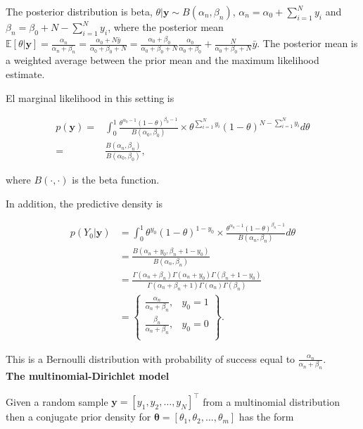 \begin{enumerate}
The posterior distribution is beta, $\theta|\mathbf{y}\sim B(\alpha_n,\beta_n)$, $\alpha_n=\alpha_0+\sum_{i=1}^N y_i$ and $\beta_n=\beta_0+N-\sum_{i=1}^Ny_i$, where the posterior mean $\mathbb{E}[\theta|\mathbf{y}]=\frac{\alpha_n}{\alpha_n+\beta_n}=\frac{\alpha_0+N\bar{y}}{\alpha_0+\beta_0+N}=\frac{\alpha_0+\beta_0}{\alpha_0+\beta_0+N}\frac{\alpha_0}{\alpha_0+\beta_0}+\frac{N}{\alpha_0+\beta_0+N}\bar{y}$. The posterior mean is a weighted average between the prior mean and the maximum likelihood estimate.

El marginal likelihood in this setting is

\begin{align}
	p(\mathbf{y})=&\int_{0}^1 \frac{\theta^{\alpha_0-1}(1-\theta)^{\beta_0-1}}{B(\alpha_0,\beta_0)}\times \theta^{\sum_{i=1}^N y_i}(1-\theta)^{N-\sum_{i=1}^N y_i}d\theta\nonumber\\
	=& \frac{B(\alpha_n,\beta_n)}{B(\alpha_0,\beta_0)},\nonumber
\end{align}

where $B(\cdot ,\cdot)$ is the beta function.

In addition, the predictive density is

\begin{align}
	p(Y_0|\mathbf{y})&=\int_0^1 \theta^{y_0}(1-\theta)^{1-y_0}\times \frac{\theta^{\alpha_n-1}(1-\theta)^{\beta_n-1}}{B(\alpha_n,\beta_n)}d\theta\nonumber\\
	&=\frac{B(\alpha_n+y_0,\beta_n+1-y_0)}{B(\alpha_n,\beta_n)}\nonumber\\
	&=\frac{\Gamma(\alpha_n+\beta_n)\Gamma(\alpha_n+y_0)\Gamma(\beta_n+1-y_0)}{\Gamma(\alpha_n+\beta_n+1)\Gamma(\alpha_n)\Gamma(\beta_n)}\nonumber\\
	&=\begin{Bmatrix}
		\frac{\alpha_n}{\alpha_n+\beta_n}, & y_0=1\\
		\frac{\beta_n}{\alpha_n+\beta_n}, & y_0=0\\
	\end{Bmatrix}.\nonumber
\end{align}

This is a Bernoulli distribution with probability of success equal to $\frac{\alpha_n}{\alpha_n+\beta_n}$.\\ 

\textbf{The multinomial-Dirichlet model}

Given a random sample $\mathbf{y}=[y_1,y_2,\dots,y_N]^{\top}$ from a multinomial distribution then a conjugate prior density for $\bm{\theta}=\left[\theta_1,\theta_2,\dots,\theta_m\right]$ has the form 


\end{enumerate}
